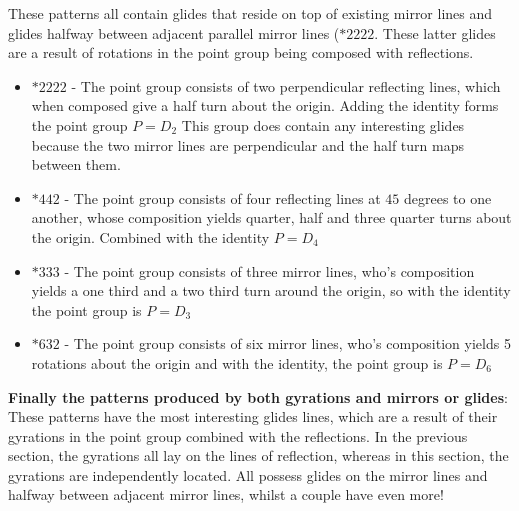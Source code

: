 \documentclass{article}
\begin{document}
These patterns all contain glides that reside on top of existing mirror lines and glides halfway between adjacent parallel mirror lines ($*2222$. These latter glides are a result of rotations in the point group being composed with reflections.
\begin{itemize}
\item$*2222$ - The point group consists of two perpendicular reflecting lines, which when composed give a half turn about the origin. Adding the identity forms the point group $P = D_2$ This group does contain any interesting glides because the two mirror lines are perpendicular and the half turn maps between them.
\item$*442$ - The point group consists of four reflecting lines at $45$ degrees to one another, whose composition yields quarter, half and three quarter turns about the origin. Combined with the identity $P = D_4$
\item$*333$ - The point group consists of three mirror lines, who's composition yields a one third and a two third turn around the origin, so with the identity the point group is $P = D_3$
\item$*632$ - The point group consists of six mirror lines, who's composition yields 5 rotations about the origin and with the identity, the point group is $P = D_6$
\end{itemize}
\textbf{Finally the patterns produced by both gyrations and mirrors or glides}:
These patterns have the most interesting glides lines, which are a result of their gyrations in the point group combined with the reflections. In the previous section, the gyrations all lay on the lines of reflection, whereas in this section, the gyrations are independently located. All possess glides on the mirror lines and halfway between adjacent mirror lines, whilst a couple have even more!
\end{document}
